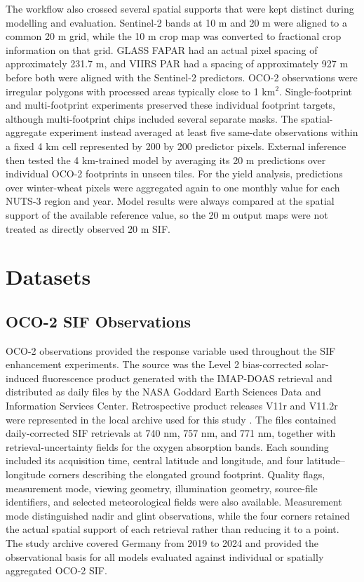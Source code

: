 The workflow also crossed several spatial supports that were kept distinct during modelling and evaluation. Sentinel-2 bands at 10 m and 20 m were aligned to a common 20 m grid, while the 10 m crop map was converted to fractional crop information on that grid. GLASS FAPAR had an actual pixel spacing of approximately 231.7 m, and VIIRS PAR had a spacing of approximately 927 m before both were aligned with the Sentinel-2 predictors. OCO-2 observations were irregular polygons with processed areas typically close to 1 km$^2$. Single-footprint and multi-footprint experiments preserved these individual footprint targets, although multi-footprint chips included several separate masks. The spatial-aggregate experiment instead averaged at least five same-date observations within a fixed 4 km cell represented by 200 by 200 predictor pixels. External inference then tested the 4 km-trained model by averaging its 20 m predictions over individual OCO-2 footprints in unseen tiles. For the yield analysis, predictions over winter-wheat pixels were aggregated again to one monthly value for each NUTS-3 region and year. Model results were always compared at the spatial support of the available reference value, so the 20 m output maps were not treated as directly observed 20 m SIF.

\section{Datasets\label{sec:datasets}}

\subsection{OCO-2 SIF Observations}

OCO-2 observations provided the response variable used throughout the SIF enhancement experiments. The source was the Level 2 bias-corrected solar-induced fluorescence product generated with the IMAP-DOAS retrieval and distributed as daily files by the NASA Goddard Earth Sciences Data and Information Services Center. Retrospective product releases V11r and V11.2r were represented in the local archive used for this study \cite{oco2_sif_v11r,oco2_sif_v112r}. The files contained daily-corrected SIF retrievals at 740 nm, 757 nm, and 771 nm, together with retrieval-uncertainty fields for the oxygen absorption bands. Each sounding included its acquisition time, central latitude and longitude, and four latitude--longitude corners describing the elongated ground footprint. Quality flags, measurement mode, viewing geometry, illumination geometry, source-file identifiers, and selected meteorological fields were also available. Measurement mode distinguished nadir and glint observations, while the four corners retained the actual spatial support of each retrieval rather than reducing it to a point. The study archive covered Germany from 2019 to 2024 and provided the observational basis for all models evaluated against individual or spatially aggregated OCO-2 SIF.

